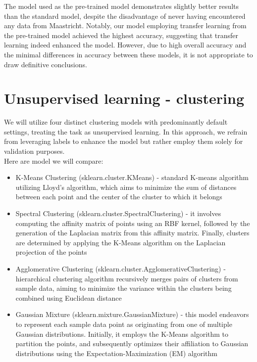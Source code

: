 \documentclass[a4paper]{article}
\begin{document}
	The model used as the pre-trained model demonstrates slightly better results than the standard model, despite the disadvantage of never having encountered any data from Maastricht. Notably, our model employing transfer learning from the pre-trained model achieved the highest accuracy, suggesting that transfer learning indeed enhanced the model. However, due to high overall accuracy and the minimal differences in accuracy between these models, it is not appropriate to draw definitive conclusions.
	
	\newpage
	
	\section{Unsupervised learning - clustering}
	
	We will utilize four distinct clustering models with predominantly default settings, treating the task as unsupervised learning. In this approach, we refrain from leveraging labels to enhance the model but rather employ them solely for validation purposes.
	\\
	
	Here are model we will compare:
	\begin{itemize}
		\item K-Means Clustering (sklearn.cluster.KMeans) - standard K-means algorithm utilizing Lloyd's algorithm, which aims to minimize the sum of distances between each point and the center of the cluster to which it belongs
		\item Spectral Clustering (sklearn.cluster.SpectralClustering) - it involves computing the affinity matrix of points using an RBF kernel, followed by the generation of the Laplacian matrix from this affinity matrix. Finally, clusters are determined by applying the K-Means algorithm on the Laplacian projection of the points
		\item Agglomerative Clustering (sklearn.cluster.AgglomerativeClustering) - hierarchical clustering algorithm recursively merges pairs of clusters from sample data, aiming to minimize the variance within the clusters being combined using Euclidean distance 
		\item Gaussian Mixture (sklearn.mixture.GaussianMixture) - this model endeavors to represent each sample data point as originating from one of multiple Gaussian distributions. Initially, it employs the K-Means algorithm to partition the points, and subsequently optimizes their affiliation to Gaussian distributions using the Expectation-Maximization (EM) algorithm
	\end{itemize}
\end{document}
